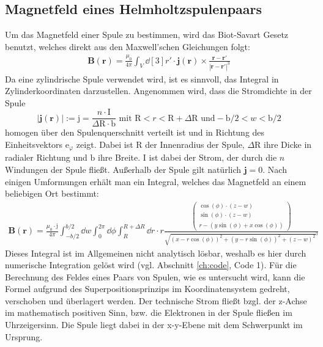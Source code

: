 \documentclass[12pt,a4paper]{article}
\begin{document}
\subsection{Magnetfeld eines Helmholtzspulenpaars}
Um das Magnetfeld einer Spule zu bestimmen, wird das Biot-Savart Gesetz benutzt, welches direkt aus den Maxwell'schen Gleichungen folgt:
\begin{align}
\textbf{B}(\textbf{r}) = \frac{\mu_0}{4\pi}\int_{V} \dd[3]{r'} \cdot \textbf{j}(\textbf{r}) \times \frac{\textbf{r}-\textbf{r}'}{|\textbf{r}-\textbf{r}'|^3}
\end{align}
Da eine zylindrische Spule verwendet wird, ist es sinnvoll, das Integral in Zylinderkoordinaten darzustellen.
Angenommen wird, dass die Stromdichte in der Spule
\begin{equation*}
|\textbf{j}(\textbf{r})| := \text{j} = \frac{n\cdot\text{I}}{\Delta\text{R}\cdot\text{b}} \text{ mit } \text{R}<r<\text{R}+\Delta\text{R} \text{ und} -\text{b}/2<w<\text{b}/2
\end{equation*} homogen über den Spulenquerschnitt verteilt ist und in Richtung des Einheitsvektors e$_{\varphi}$ zeigt. Dabei ist $\text{R}$ der Innenradius der Spule, $\Delta \text{R}$ ihre Dicke in radialer Richtung und $\text{b}$ ihre Breite. $\text{I}$ ist dabei der Strom, der durch die $n$ Windungen der Spule fließt. Außerhalb der Spule gilt natürlich $\textbf{j} = 0$.
Nach einigen Umformungen erhält man ein Integral, welches das Magnetfeld an einem beliebigen Ort bestimmt:
\begin{align}
\textbf{B}(\textbf{r}) = \frac{\mu_0\cdot\text{j}}{4\pi}\int_{-b/2}^{b/2}\dd w\int_{0}^{2\pi}\dd \phi\int_{R}^{R+\Delta R}\dd r\cdot r \frac{\begin{pmatrix}
	\cos(\phi)\cdot (z-w) \\
	\sin(\phi)\cdot (z-w) \\
	r-(y\sin(\phi)+x\cos(\phi))
	\end{pmatrix}}{\sqrt{(x-r\cos(\phi))^2+(y-r\sin(\phi))^2+(z-w)^2}^3}
\label{eq:Btheo}
\end{align}
\indent Dieses Integral ist im Allgemeinen nicht analytisch lösbar, weshalb es hier durch numerische Integration gelöst wird (vgl. Abschnitt \ref{ch:code}, Code 1). Für die Berechnung des Feldes eines Paars von Spulen, wie es untersucht wird, kann die Formel aufgrund des Superpositionsprinzips im Koordinatensystem gedreht, verschoben und überlagert werden. Der technische Strom fließt bzgl. der z-Achse im mathematisch positiven Sinn, bzw. die Elektronen in der Spule fließen im Uhrzeigersinn. Die Spule liegt dabei in der x-y-Ebene mit dem Schwerpunkt im Ursprung.
\end{document}
